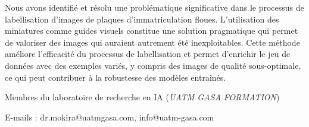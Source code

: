 \documentclass[twocolumn]{el-author}
\begin{document}
Nous avons identifié et résolu une problématique significative dans le processus de labellisation d'images de plaques d'immatriculation floues. L'utilisation des miniatures comme guides visuels constitue une solution pragmatique qui permet de valoriser des images qui auraient autrement été inexploitables. Cette méthode améliore l'efficacité du processus de labellisation et permet d'enrichir le jeu de données avec des exemples variés, y compris des images de qualité sous-optimale, ce qui peut contribuer à la robustesse des modèles entraînés.


\vskip5pt

\noindent Membres du laboratoire de recherche en IA (\textit{UATM GASA FORMATION})
\vskip3pt

\noindent E-mails : dr.mokira@uatmgasa.com, info@uatm-gasa.com
\end{document}
